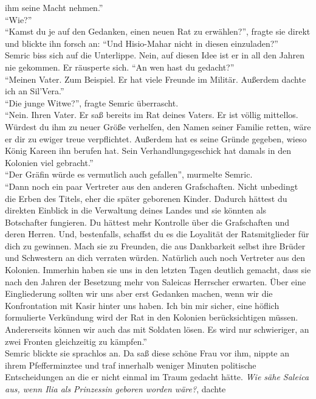 ihm seine Macht nehmen.''\\
``Wie?''\\
``Kamst du je auf den Gedanken, einen neuen Rat zu erwählen?'', fragte sie direkt und blickte ihn 
forsch an: ``Und Hisio-Mahar nicht in diesen einzuladen?''\\
Semric biss sich auf die Unterlippe. Nein, auf diesen Idee ist er in all den Jahren nie gekommen. 
Er räusperte sich. ``An wen hast du gedacht?''\\
``Meinen Vater. Zum Beispiel. Er hat viele Freunde im Militär. Außerdem dachte ich an Sil'Vera.''\\
``Die junge Witwe?'', fragte Semric überrascht.\\
``Nein. Ihren Vater. Er saß bereits im Rat deines Vaters. Er ist völlig mittellos. Würdest du ihm 
zu neuer Größe verhelfen, den Namen seiner Familie retten, wäre er dir zu ewiger treue 
verpflichtet. Außerdem hat es seine Gründe gegeben, wieso König Kareen ihn berufen hat. Sein 
Verhandlungsgeschick hat damals in den Kolonien viel gebracht.''\\
``Der Gräfin würde es vermutlich auch gefallen'', murmelte Semric.\\
``Dann noch ein paar Vertreter aus den anderen Grafschaften. Nicht unbedingt die Erben des Titels, 
eher die später geborenen Kinder. Dadurch hättest du direkten Einblick in die Verwaltung deines 
Landes und sie könnten als Botschafter fungieren. Du hättest mehr Kontrolle über die Grafschaften 
und deren Herren. Und, bestenfalls, schaffst du es die Loyalität der Ratsmitglieder für dich zu 
gewinnen. Mach sie zu Freunden, die aus Dankbarkeit selbst ihre Brüder und Schwestern an dich 
verraten würden. Natürlich auch noch Vertreter aus den Kolonien. Immerhin haben sie uns in den 
letzten Tagen deutlich gemacht, dass sie nach den Jahren der Besetzung mehr von Saleicas 
Herrscher erwarten. Über eine Eingliederung sollten wir uns aber erst Gedanken machen, wenn wir 
die Konfrontation mit Kasir hinter uns haben. Ich bin mir sicher, eine höflich formulierte 
Verkündung wird der Rat in den Kolonien berücksichtigen müssen. Andererseits können wir auch das 
mit Soldaten lösen. Es wird nur schwieriger, an zwei Fronten gleichzeitig zu kämpfen.''\\
Semric blickte sie sprachlos an. Da saß diese schöne Frau vor ihm, nippte an ihrem Pfefferminztee 
und traf innerhalb weniger Minuten politische Entscheidungen an die er nicht einmal im Traum 
gedacht hätte. \textit{Wie sähe Saleica aus, wenn Ilia als Prinzessin geboren worden wäre?}, dachte 
